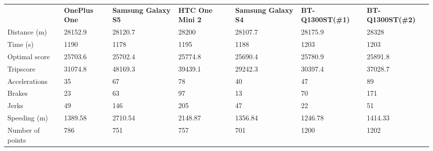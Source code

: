 \begin{landscape}
\begin{table*}[h]
\begin{minipage}{0.95\textwidth}
\begin{tabular}{|l|llllll|}
                 & \textbf{OnePlus One} & \textbf{Samsung Galaxy S5} & \textbf{HTC One Mini 2} & \textbf{Samsung Galaxy S4} & \textbf{BT-Q1300ST(\#1)} & \textbf{BT-Q1300ST(\#2)} \\
Distance (m)     & 28152.9     & 28120.7           & 28200          & 28107.7           & 28175.9         & 28328           \\
Time (s)         & 1190        & 1178              & 1195           & 1188              & 1203            & 1203            \\
Optimal score    & 25703.6     & 25702.4           & 25774.8        & 25690.4           & 25780.9         & 25891.8         \\
Tripscore        & 31074.8     & 48169.3           & 39439.1        & 29242.3           & 30397.4         & 37028.7         \\
Accelerations    & 35          & 67                & 78             & 40                & 47              & 89              \\
Brakes           & 23          & 63                & 97             & 13                & 70              & 171             \\
Jerks            & 49          & 146               & 205            & 47                & 22              & 51              \\
Speeding (m)     & 1389.58     & 2710.54           & 2148.87        & 1356.84           & 1246.78         & 1414.33         \\
Number of points & 786         & 751               & 757            & 701               & 1200            & 1202            \\\hline
\end{tabular}
\end{minipage}
\end{table*}
\end{landscape}

\newpage

